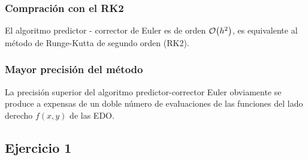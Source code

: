 \documentclass[12pt]{beamer}
\begin{document}
\begin{frame}
\frametitle{Compración con el RK2}
El algoritmo predictor - corrector de Euler es de orden $\order{h^2}$, es equivalente al método de Runge-Kutta de segundo orden (RK2). 
\end{frame}
\begin{frame}
\frametitle{Mayor precisión del método}
La precisión superior del algoritmo predictor-corrector Euler obviamente se produce a expensas de un doble número de evaluaciones de las funciones del lado derecho $f (x, y)$ de las EDO.
\end{frame}

\subsection{Ejercicio 1}
\end{document}
